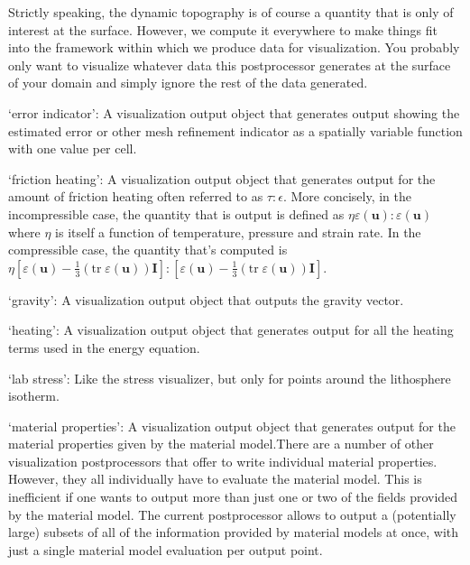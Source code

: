 \begin{itemize}
Strictly speaking, the dynamic topography is of course a quantity that is only of interest at the surface. However, we compute it everywhere to make things fit into the framework within which we produce data for visualization. You probably only want to visualize whatever data this postprocessor generates at the surface of your domain and simply ignore the rest of the data generated.

`error indicator': A visualization output object that generates output showing the estimated error or other mesh refinement indicator as a spatially variable function with one value per cell.

`friction heating': A visualization output object that generates output for the amount of friction heating often referred to as $\tau:\epsilon$. More concisely, in the incompressible case, the quantity that is output is defined as $\eta \varepsilon(\mathbf u):\varepsilon(\mathbf u)$ where $\eta$ is itself a function of temperature, pressure and strain rate. In the compressible case, the quantity that's computed is $\eta [\varepsilon(\mathbf u)-\tfrac 13(\textrm{tr}\;\varepsilon(\mathbf u))\mathbf I]:[\varepsilon(\mathbf u)-\tfrac 13(\textrm{tr}\;\varepsilon(\mathbf u))\mathbf I]$.

`gravity': A visualization output object that outputs the gravity vector.

`heating': A visualization output object that generates output for all the heating terms used in the energy equation.

`lab stress': Like the stress visualizer, but only for points around the lithosphere isotherm.

`material properties': A visualization output object that generates output for the material properties given by the material model.There are a number of other visualization postprocessors that offer to write individual material properties. However, they all individually have to evaluate the material model. This is inefficient if one wants to output more than just one or two of the fields provided by the material model. The current postprocessor allows to output a (potentially large) subsets of all of the information provided by material models at once, with just a single material model evaluation per output point.


\end{itemize}

